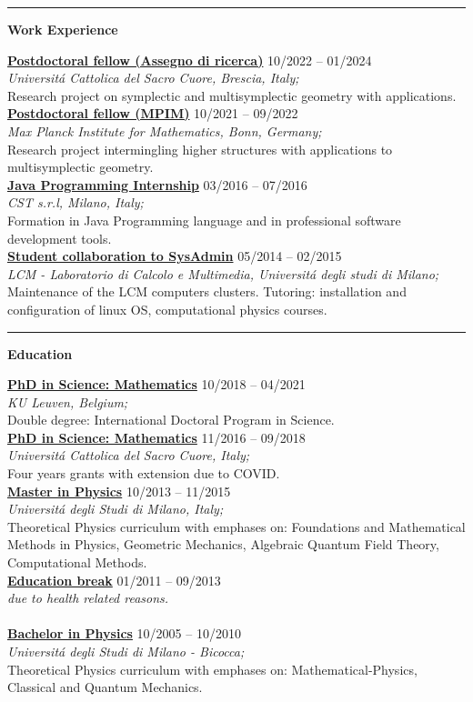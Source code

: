 \documentclass[a4paper]{article}
\newcommand{\block}[1]{\hrule \vspace{0.2cm} \textbf{\Large #1} \vspace{0.2cm}}
\newcommand{\voice}[5]{\href{#4}{\textbf{#1}} \hfill #2 \\ \textit{#3} \\ {\small #5} \vspace{0.2cm} \\}
\begin{document}

	\block{Work Experience}

	\voice{Postdoctoral fellow (Assegno di ricerca)}
		{10/2022 -- 01/2024}
		{Universit\'a Cattolica del Sacro Cuore, Brescia, Italy;}
		{https://dipartimenti.unicatt.it/dmf-home}       
		{Research project on symplectic and multisymplectic geometry with applications.}
	\voice{Postdoctoral fellow (MPIM)}
		{10/2021 -- 09/2022}
		{Max Planck Institute for Mathematics, Bonn, Germany;}
		{https://www.mpim-bonn.mpg.de/}       
		{Research project intermingling higher structures with applications to multisymplectic geometry.}
	\voice{Java Programming Internship}
		{03/2016 -- 07/2016}
		{CST s.r.l, Milano, Italy;}
		{https://www.csttech.it/}       
		{Formation in Java Programming language and in professional software development tools.}
	\voice{Student collaboration to SysAdmin}
		{05/2014 -- 02/2015}
		{LCM - Laboratorio di Calcolo e Multimedia, Universit\'a degli studi di Milano;}
		{https://lcm.mi.infn.it/}       
		{Maintenance of the LCM computers clusters. Tutoring: installation and configuration of linux OS, computational physics courses.\vspace{-0.25cm}}


	\block{Education}

	\voice{PhD in Science: Mathematics}
		{10/2018 -- 04/2021}
		{KU Leuven, Belgium;}
		{https://web.archive.org/save/http://scuoledidottorato.unicatt.it/phdschools/science-research-projects}       
		{Double degree: International Doctoral Program in Science.}
	\voice{PhD in Science: Mathematics}
		{11/2016 -- 09/2018}
		{Universit\'a Cattolica del Sacro Cuore, Italy;}
		{https://web.archive.org/save/http://scuoledidottorato.unicatt.it/phdschools/science-research-projects}       
		{Four years grants with extension due to COVID.}
	\voice{Master in Physics}
		{10/2013 -- 11/2015}
		{Universit\'a degli Studi di Milano, Italy;}
		{https://www.unimi.it/en/education/master-programme/physics-master-programme}       
		{Theoretical Physics curriculum with emphases on: Foundations and Mathematical Methods in Physics, Geometric Mechanics, Algebraic Quantum Field Theory, Computational Methods.}
	\voice{Education break}
		{01/2011 -- 09/2013}
		{due to health related reasons.}
		{}       
		{\vspace{-0.25cm}}
	\voice{Bachelor in Physics}
		{10/2005 -- 10/2010}
		{Universit\'a degli Studi di Milano - Bicocca;}
		{https://www.fisica.unimib.it/en/teaching/degree-courses/bachelor-three-year-laurea-physics}       
		{Theoretical Physics curriculum with emphases on: Mathematical-Physics, Classical and Quantum Mechanics.}
\end{document}
